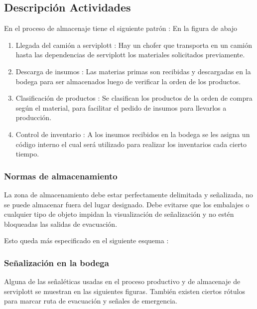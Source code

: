 	\subsection{Descripción Actividades}
	En el proceso de almacenaje tiene el siguiente patrón :
	En la figura de abajo 
	\begin{enumerate}[1)]
	\item Llegada del camión a serviplott : Hay un chofer que transporta en un camión hasta las dependencias de serviplott los materiales solicitados previamente. 
    \item Descarga de insumos : Las materias primas son recibidas y descargadas en la bodega para ser almacenados luego de verificar la orden de los productos.
    \item Clasificación de productos : Se clasifican los productos de la orden de compra según el material, para facilitar el pedido de insumos para llevarlos a producción.
    \item Control de inventario : A los insumos recibidos en la bodega se les asigna un código interno el cual será utilizado para realizar los inventarios cada cierto tiempo.
    \end{enumerate}
		\subsubsection{Normas de almacenamiento}
		La zona de almacenamiento debe estar perfectamente delimitada y señalizada, no se puede almacenar fuera del lugar designado. Debe evitarse que los embalajes o cualquier tipo de objeto impidan la visualización de señalización y no estén bloqueadas las salidas de evacuación.
 
 
	Esto queda más especificado en el siguiente esquema : 
	\newpage
		 \subsubsection{Señalización en la bodega}
		 Alguna de las señaléticas usadas en el proceso productivo y de almacenaje de serviplott se muestran en las siguientes figuras.
		 También existen ciertos rótulos para marcar ruta de evacuación y señales de emergencia.
